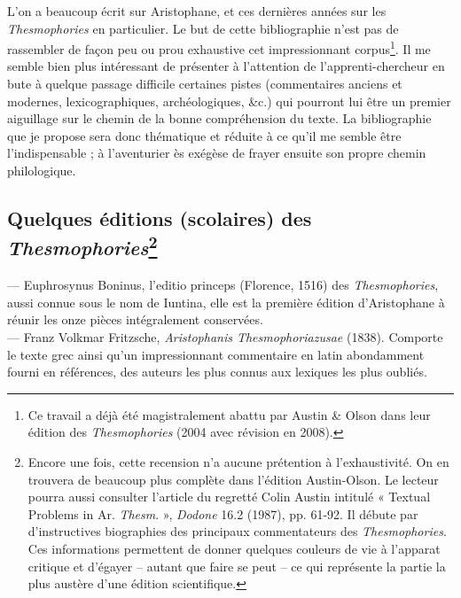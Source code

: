 \documentclass{book}%
\newcommand{\italique}[1]{\textit{#1}}%
\newcommand{\latin}[1]{{\policeLat #1}}%
\newcommand{\sousPartie}[1]{\subsection*{#1}}%
\newcommand{\note}[1]{\footnote{#1}}
\begin{document}
L'on a beaucoup écrit sur Aristophane, et ces dernières années sur les \italique{Thesmophories} en particulier. Le but de cette bibliographie n'est pas de rassembler de façon peu ou prou exhaustive cet impressionnant corpus\note{Ce travail a déjà été magistralement abattu par Austin \& Olson dans leur édition des \italique{Thesmophories} (2004 avec révision en 2008).}.
Il me semble bien plus intéressant de présenter à l'attention de l'apprenti-chercheur en bute à quelque passage difficile certaines pistes (commentaires anciens et modernes, lexicographiques, archéologiques, \&c.) qui pourront lui être un premier aiguillage sur le chemin de la bonne compréhension du texte. 
La bibliographie que je propose sera donc thématique et réduite à ce qu'il me semble être l'indispensable ; à l'aventurier ès exégèse de frayer ensuite son propre chemin philologique.

\sousPartie{Quelques éditions (scolaires) des \italique{Thesmophories}\note{Encore une fois, cette recension n'a aucune prétention à l'exhaustivité. On en trouvera de beaucoup plus complète dans l'édition Austin-Olson. Le lecteur pourra aussi consulter l'article du regretté Colin Austin intitulé « Textual Problems in Ar. \italique{Thesm}. », \italique{Dodone} 16.2 (1987), pp. 61-92. Il débute par d'instructives biographies des principaux commentateurs des \italique{Thesmophories}. Ces informations permettent de donner quelques couleurs de vie à l'apparat critique et d'égayer -- autant que faire se peut -- ce qui représente la partie la plus austère d'une édition scientifique.}}


--- Euphrosynus Boninus, l’editio princeps (Florence, 1516) des \italique{Thesmophories}, aussi connue sous le nom de \latin{Iuntina}, elle est la première édition d’Aristophane à réunir les onze pièces intégralement conservées. \\

--- Franz Volkmar Fritzsche, \italique{Aristophanis Thesmophoriazusae} (1838). Comporte le texte grec ainsi qu’un impressionnant commentaire en latin abondamment fourni en références, des auteurs les plus connus aux lexiques les plus oubliés. \\
\end{document}
